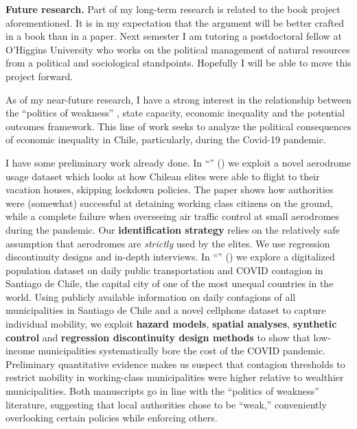 \documentclass[10pt,stdletter,dateno,sigleft]{newlfm} %
\begin{document}
\begin{newlfm}
{\bf Future research.} Part of my long-term research is related to the book project aforementioned. It is in my expectation that the argument will be better crafted in a book than in a paper. Next semester I am tutoring a postdoctoral fellow at O'Higgins University who works on the political management of natural resources from a political and sociological standpoints. Hopefully I will be able to move this project forward. 

As of my near-future research, I have a strong interest in the relationship between the ``politics of weakness'' \parencite{Brinks2020}, state capacity, economic inequality and the potential outcomes framework. This line of work seeks to analyze the political consequences of economic inequality in Chile, particularly, during the Covid-19 pandemic. 

I have some preliminary work already done. In ``\href{https://raw.githubusercontent.com/hbahamonde/Tobalaba/master/abstract.txt}{{\unskip}}'' (\emph{\unskip}) we exploit a novel aerodrome usage dataset which looks at how Chilean elites were able to flight to their vacation houses, skipping lockdown policies. The paper shows how authorities were (somewhat) successful at detaining working class citizens on the ground, while a complete failure when overseeing air traffic control at small aerodromes during the pandemic. Our {\bf identification strategy} relies on the relatively safe assumption that aerodromes are \emph{strictly} used by the elites. We use regression discontinuity designs and in-depth interviews. In ``\href{https://github.com/hbahamonde/Bus/raw/main/abstract.txt}{{\unskip}}'' (\emph{\unskip})  we explore a digitalized population dataset on daily public transportation and COVID contagion in Santiago de Chile, the capital city of one of the most unequal countries in the world. Using publicly available information on daily contagions of all municipalities in Santiago de Chile and a novel cellphone dataset to capture individual mobility, we exploit {\bf hazard models}, {\bf spatial analyses}, {\bf synthetic control} and {\bf regression discontinuity design methods} to show that low-income municipalities systematically bore the cost of the COVID pandemic. Preliminary quantitative evidence makes us suspect that contagion thresholds to restrict mobility in working-class municipalities were higher relative to wealthier municipalities. Both manuscripts go in line with the ``politics of weakness'' literature, suggesting that local authorities chose to be ``weak,'' conveniently overlooking certain policies while enforcing others.


\end{newlfm}
\end{document}
